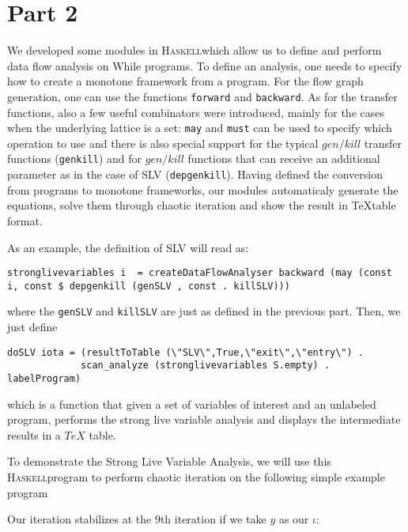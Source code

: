 \documentclass[a4wide,12pt]{article}
\def\haskell{\textsc{Haskell}}
\def\program#1{\fbox{\begin{minipage}{0.5\textwidth}\protect{$\begin{array}{ll} #1 \end{array}$}\end{minipage}}}
\def\hs#1{\texttt{#1}}
\begin{document}
 
\section{Part 2}
 
We developed some modules in \haskell which allow us to define and perform
data flow analysis on While programs. To define an analysis,
one needs to specify how to create a monotone framework from a program.
For the flow graph generation, one can use the functions \hs{forward} and \hs{backward}.
As for the transfer functions, also a few useful combinators were introduced, mainly
for the cases when the underlying lattice is a set: \hs{may} and \hs{must}
can be used to specify which operation to use and there is also special support
for the typical $gen/kill$ transfer functions (\hs{genkill}) and for
$gen/kill$ functions that can receive an additional parameter as in the case of SLV
(\hs{depgenkill}). Having defined the conversion from programs to monotone frameworks,
our modules automaticaly generate the equations, solve them through chaotic iteration
and show the result in \TeX table format. 

As an example, the definition of SLV will read as:

{\small
\begin{verbatim}
stronglivevariables i  = createDataFlowAnalyser backward (may (const i, const $ depgenkill (genSLV , const . killSLV)))
\end{verbatim}
}

\noindent
where the \hs{genSLV} and \hs{killSLV} are just as defined in the previous part. Then, we just define

{\small
\begin{verbatim}
doSLV iota = (resultToTable (\"SLV\",True,\"exit\",\"entry\") .
             scan_analyze (stronglivevariables S.empty) . labelProgram)
\end{verbatim}
}

\noindent
which is a function that given a set of variables of interest
and an unlabeled program, performs the strong live variable analysis and displays
the intermediate results in a $TeX$ table.


To demonstrate the Strong Live Variable Analysis, we will use this \haskell program
to perform chaotic iteration on the following simple example program

\label{exprog1}
\program{}
 
Our iteration stabilizes at the 9th iteration if we take $y$ as our $\iota$:
 
\end{document}
